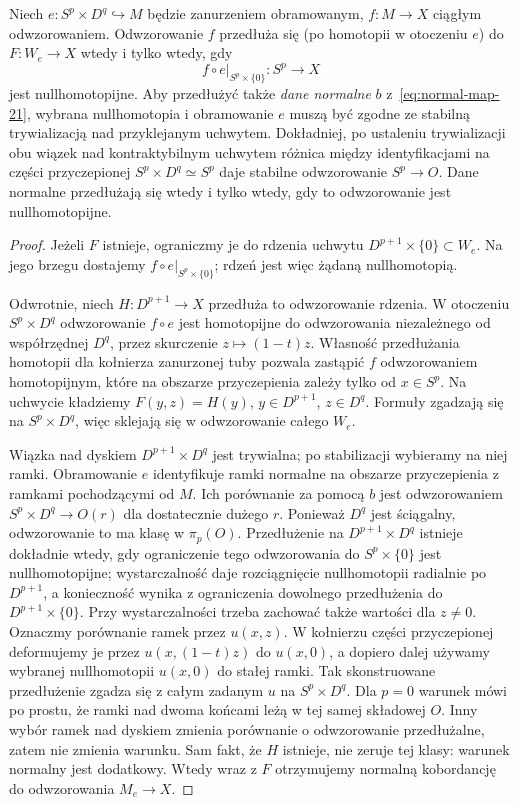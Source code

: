 \begin{twierdzenie}
\label{thm:przedluzenie-mapy-21}
Niech $e:S^p\times D^q\hookrightarrow M$ będzie
zanurzeniem obramowanym, $f:M\to X$ ciągłym
odwzorowaniem. Odwzorowanie $f$ przedłuża się
(po homotopii w otoczeniu $e$) do
$F:W_e\to X$ wtedy i tylko wtedy, gdy
\[
 f\circ e|_{S^p\times\{0\}}:S^p\to X
\]
jest nullhomotopijne. Aby przedłużyć także
\emph{dane normalne} $b$ z~\eqref{eq:normal-map-21},
wybrana nullhomotopia i obramowanie $e$
muszą być zgodne ze stabilną trywializacją
nad przyklejanym uchwytem. Dokładniej,
po ustaleniu trywializacji obu wiązek nad
kontraktybilnym uchwytem różnica między
identyfikacjami na części przyczepionej
$S^p\times D^q\simeq S^p$ daje stabilne odwzorowanie
$S^p\to O$. Dane normalne przedłużają się
wtedy i tylko wtedy, gdy to odwzorowanie jest
nullhomotopijne.
\end{twierdzenie}
\begin{proof}
Jeżeli $F$ istnieje, ograniczmy je do rdzenia
uchwytu $D^{p+1}\times\{0\}\subset W_e$.
Na jego brzegu dostajemy $f\circ e|_{S^p\times\{0\}}$;
rdzeń jest więc żądaną nullhomotopią.

Odwrotnie, niech $H:D^{p+1}\to X$ przedłuża
to odwzorowanie rdzenia. W otoczeniu
$S^p\times D^q$ odwzorowanie $f\circ e$
jest homotopijne do odwzorowania niezależnego od
współrzędnej $D^q$, przez skurczenie
$z\mapsto(1-t)z$. Własność przedłużania
homotopii dla kołnierza zanurzonej tuby
pozwala zastąpić $f$ odwzorowaniem homotopijnym,
które na obszarze przyczepienia zależy
tylko od $x\in S^p$. Na uchwycie kładziemy
$F(y,z)=H(y)$, $y\in D^{p+1}$, $z\in D^q$.
Formuły zgadzają się na $S^p\times D^q$,
więc sklejają się w odwzorowanie całego $W_e$.

Wiązka nad dyskiem $D^{p+1}\times D^q$ jest
trywialna; po stabilizacji wybieramy na niej
ramki. Obramowanie $e$ identyfikuje ramki
normalne na obszarze przyczepienia z ramkami
pochodzącymi od $M$. Ich porównanie za pomocą
$b$ jest odwzorowaniem $S^p\times D^q\to O(r)$
dla dostatecznie dużego $r$. Ponieważ $D^q$
jest ściągalny, odwzorowanie to ma klasę w $\pi_p(O)$.
Przedłużenie na $D^{p+1}\times D^q$ istnieje
dokładnie wtedy, gdy ograniczenie tego odwzorowania
do $S^p\times\{0\}$ jest nullhomotopijne; wystarczalność daje
rozciągnięcie nullhomotopii radialnie po
$D^{p+1}$, a konieczność wynika z ograniczenia
dowolnego przedłużenia do $D^{p+1}\times\{0\}$.
Przy wystarczalności trzeba zachować także wartości dla $z\ne0$.
Oznaczmy porównanie ramek przez $u(x,z)$.
W kołnierzu części przyczepionej deformujemy je przez
$u(x,(1-t)z)$ do $u(x,0)$, a dopiero dalej używamy
wybranej nullhomotopii $u(x,0)$ do stałej ramki.
Tak skonstruowane przedłużenie zgadza się z całym zadanym
$u$ na $S^p\times D^q$. Dla $p=0$ warunek mówi po prostu,
że ramki nad dwoma końcami leżą w tej samej składowej $O$.
Inny wybór ramek nad dyskiem zmienia porównanie
o odwzorowanie przedłużalne, zatem nie zmienia warunku.
Sam fakt, że $H$ istnieje, nie zeruje tej
klasy: warunek normalny jest dodatkowy.
Wtedy wraz z $F$ otrzymujemy normalną
kobordancję do odwzorowania $M_e\to X$.
\end{proof}

